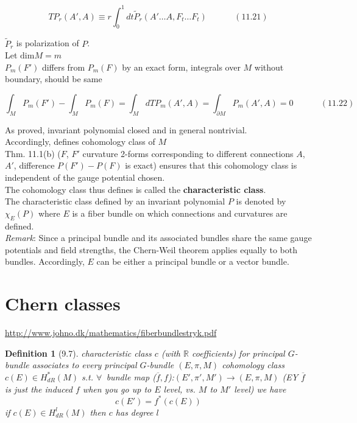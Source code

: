 \documentclass{book}
\newtheorem{definition}{Definition}
\begin{document}
\begin{equation}
TP_r(A',A) \equiv r \int_0^1 dt \widetilde{P}_r{ (A' \dots A, F_t \dots F_t ) }  \quad \quad \quad \, (11.21)
\end{equation}

$\widetilde{P}_r$ is polarization of $P$. \\

Let $\text{dim}{M} = m$ \\
$P_m(F')$ differs from $P_m(F)$ by an exact form, integrals over $M$ without boundary, should be same

\begin{equation}
  \int_M P_m(F') - \int_M P_m(F) = \int_M dTP_m(A',A) = \int_{\partial M} P_m(A',A) = 0 \quad \quad \quad \, (11.22)
\end{equation}


As proved, invariant polynomial closed and in general nontrivial.  \\
Accordingly, defines cohomology class of $M$ \\

Thm. 11.1(b) ($F$, $F'$ curvature 2-forms corresponding to different connections $A$, $A'$, difference $P(F')- P(F)$ is exact) ensures that this cohomology class is independent of the gauge potential chosen. \\
The cohomology class thus defines is called the \textbf{characteristic class}. \\
The characteristic class defined by an invariant polynomial $P$ is denoted by $\chi_E(P)$ where $E$ is a fiber bundle on which connections and curvatures are defined.   \\

\emph{Remark}: Since a principal bundle and its associated bundles share the same gauge potentials and field strengths, the Chern-Weil theorem applies equally to both bundles.  Accordingly, $E$ can be either a principal bundle or a vector bundle.

\section{Chern classes}

\url{http://www.johno.dk/mathematics/fiberbundlestryk.pdf}

\begin{definition}[9.7]
\emph{characteristic class} $c$ (with $\mathbb{R}$ coefficients) for principal $G$-bundle associates to every principal $G$-bundle $(E,\pi,M)$ cohomology class $c(E) \in H^*_{dR}(M)$ s.t. $\forall \, $ bundle map ($\overline{f}, f$):$(E',\pi', M') \to (E,\pi,M)$ (EY $\overline{f}$ is just the induced $f$ when you go up to $E$ level, vs. $M$ to $M'$ level) we have
\[
c(E') = f^*(c(E))
\]
if $c(E) \in H^l_{dR}(M)$ then $c$ has degree $l$
\end{definition}
\end{document}

